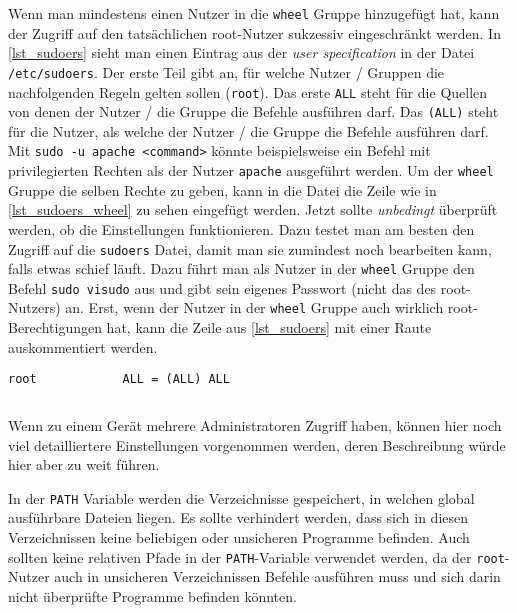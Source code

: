 Wenn man mindestens einen Nutzer in die \texttt{wheel} Gruppe hinzugefügt hat, kann der Zugriff auf den tatsächlichen root-Nutzer sukzessiv eingeschränkt werden. In \autoref{lst_sudoers} sieht man einen Eintrag aus der \emph{user specification} in der Datei \texttt{/etc/sudoers}. Der erste Teil gibt an, für welche Nutzer / Gruppen die nachfolgenden Regeln gelten sollen {\small(\texttt{root})}. Das erste \texttt{ALL} steht für die Quellen von denen der Nutzer / die Gruppe die Befehle ausführen darf. Das \texttt{(ALL)} steht für die Nutzer, als welche der Nutzer / die Gruppe die Befehle ausführen darf. Mit \texttt{sudo -u apache <command>} könnte beispielsweise ein Befehl mit privilegierten Rechten als der Nutzer \texttt{apache} ausgeführt werden. Um der \texttt{wheel} Gruppe die selben Rechte zu geben, kann in die Datei die Zeile wie in \autoref{lst_sudoers_wheel} zu sehen eingefügt werden.\cite{SudoersManual} Jetzt sollte \emph{unbedingt} überprüft werden, ob die Einstellungen funktionieren. Dazu testet man am besten den Zugriff auf die \texttt{sudoers} Datei, damit man sie zumindest noch bearbeiten kann, falls etwas schief läuft. Dazu führt man als Nutzer in der \texttt{wheel} Gruppe den Befehl \texttt{sudo visudo} aus und gibt sein eigenes Passwort {\small(nicht das des root-Nutzers)} an. Erst, wenn der Nutzer in der \texttt{wheel} Gruppe auch wirklich root-Berechtigungen hat, kann die Zeile aus \autoref{lst_sudoers} mit einer Raute auskommentiert werden.

\begin{lstlisting}[caption=Berechtigungen in der \texttt{/etc/sudoers} Konfiguration, label=lst_sudoers]
	root            ALL = (ALL) ALL
\end{lstlisting}

\begin{lstlisting}[caption=Berechtigungen der \texttt{wheel} Gruppe, label=lst_sudoers_wheel]
	%wheel          ALL = (ALL) ALL
\end{lstlisting}

Wenn zu einem Gerät mehrere Administratoren Zugriff haben, können hier noch viel detailliertere Einstellungen vorgenommen werden\cite{SudoersManual}, deren Beschreibung würde hier aber zu weit führen.

In der \texttt{PATH} Variable werden die Verzeichnisse gespeichert, in welchen global ausführbare Dateien liegen. Es sollte verhindert werden, dass sich in diesen Verzeichnissen keine beliebigen oder unsicheren Programme befinden. Auch sollten keine relativen Pfade in der \texttt{PATH}-Variable verwendet werden, da der \texttt{root}-Nutzer auch in unsicheren Verzeichnissen Befehle ausführen muss und sich darin nicht überprüfte Programme befinden könnten.\cite[S. 47]{GuideSecureConfiguration2011}


